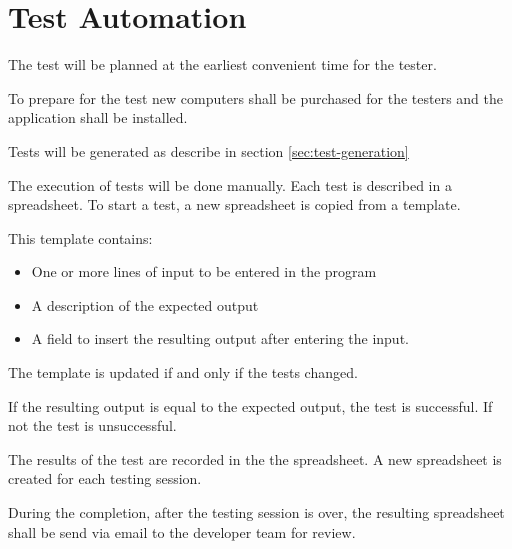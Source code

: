 \documentclass[11pt,a4paper]{article}
\begin{document}




\section{Test Automation}\label{sec:test-automation}

The test will be planned at the earliest convenient time for the
tester.

To prepare for the test new computers shall be purchased for the
testers and the application shall be installed.

Tests will be generated as describe in section \ref{sec:test-generation}

The execution of tests will be done manually. Each test is described
in a spreadsheet. To start a test, a new spreadsheet is copied from a
template.

This template contains:

\begin{itemize}
\item One or more lines of input to be entered in the program
\item A description of the expected output %
\item A field to insert the resulting output after entering the input.
\end{itemize}

The template is updated if and only if the tests  changed.

If the resulting output is equal to the expected output, the test is
successful. If not the test is unsuccessful.

The results of the test are recorded in the the spreadsheet. A new
spreadsheet is created for each testing session.

During the completion, after the testing session is over, the resulting spreadsheet shall be
send via email to the developer team for review.
\end{document}
